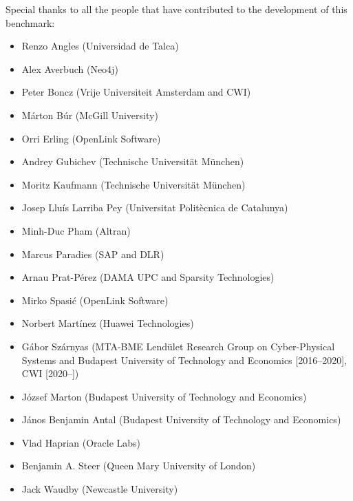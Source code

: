 Special thanks to all the people that have contributed to the development of this benchmark:
\begin{itemize}
  \item Renzo Angles (Universidad de Talca)
  \item Alex Averbuch (Neo4j)
  \item Peter Boncz (Vrije Universiteit Amsterdam and CWI)
  \item M\'arton B\'ur (McGill University)
  \item Orri Erling (OpenLink Software)
  \item Andrey Gubichev (Technische Universit\"at M\"unchen)
  \item Moritz Kaufmann (Technische Universit\"at M\"unchen)
  \item Josep Llu\'is Larriba Pey (Universitat Polit\`ecnica de Catalunya)
  \item Minh-Duc Pham (Altran)
  \item Marcus Paradies (SAP and DLR)
  \item Arnau Prat-P\'erez (DAMA UPC and Sparsity Technologies)
  \item Mirko Spasi\'c (OpenLink Software)
  \item Norbert Mart\'inez (Huawei Technologies)
  \item G\'abor Sz\'arnyas (MTA-BME Lend\"ulet Research Group on Cyber-Physical Systems and Budapest University of Technology and Economics [2016--2020], CWI [2020--])
  \item J\'ozsef Marton (Budapest University of Technology and Economics)
  \item J\'anos Benjamin Antal (Budapest University of Technology and Economics)
  \item Vlad Haprian (Oracle Labs)
  \item Benjamin A. Steer (Queen Mary University of London)
  \item Jack Waudby (Newcastle University)
\end{itemize}
